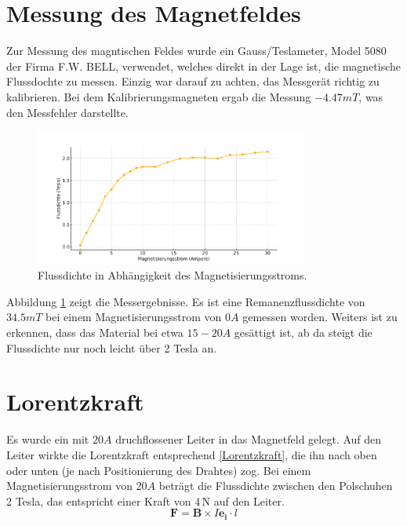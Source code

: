 \documentclass[a4paper,twoside,12pt,DIV=13,BCOR=5mm,numbers=noenddot,cleardoublepage=empty]{scrbook}
\begin{document}
\section{Messung des Magnetfeldes}
Zur Messung des magntischen Feldes wurde ein Gauss/Teslameter, Model 5080 der Firma F.W. BELL, verwendet, welches direkt in der Lage ist, die magnetische Flussdochte zu messen. Einzig war darauf zu achten, das Messgerät richtig zu kalibrieren. Bei dem Kalibrierungsmagneten ergab die Messung $-4.47 mT$, was den Messfehler darstellte.

\begin{figure}[H]
    \centering
    \includegraphics[width=0.8\textwidth]{pictures/Flussdichte_Strom_Plot_Updated.pdf}
    \caption{Flussdichte in Abhängigkeit des Magnetisierungsstroms.}
    \label{fig:flussdichtestrom}
\end{figure}

\noindent Abbildung \ref{fig:flussdichtestrom} zeigt die Messergebnisse. Es ist eine Remanenzflussdichte von $34.5 mT$ bei einem Magnetisierungsstrom von $0 A$ gemessen worden. Weiters ist zu erkennen, dass das Material bei etwa $15-20 A$ gesättigt ist, ab da steigt die Flussdichte nur noch leicht über 2 Tesla an.

\section{Lorentzkraft}
Es wurde ein mit $20 A$ druchflossener Leiter in das Magnetfeld gelegt. Auf den Leiter wirkte die Lorentzkraft entsprechend \ref{Lorentzkraft}, die ihn nach oben oder unten (je nach Positionierung des Drahtes) zog. Bei einem Magnetisierungsstrom von $20 A$ beträgt die Flussdichte zwischen den Polschuhen 2 Tesla, das entspricht einer Kraft von 4\,N auf den Leiter.
\begin{equation}
	\mathbf{F} = \mathbf{B} \times I \mathbf{e_i} \cdot l
	\label{Lorentzkraft}
\end{equation}
\end{document}

